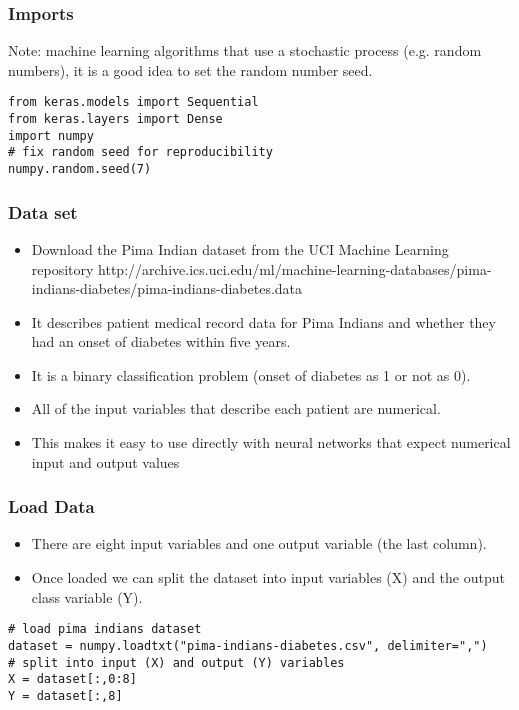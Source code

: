 \begin{frame}[fragile] \frametitle{Imports}
Note: machine learning algorithms that use a stochastic process (e.g. random numbers), it is a good idea to set the random number seed.
\begin{lstlisting}
from keras.models import Sequential
from keras.layers import Dense
import numpy
# fix random seed for reproducibility
numpy.random.seed(7)
\end{lstlisting}
\end{frame}

\begin{frame}[fragile] \frametitle{Data set}
 \begin{itemize}
 \item  Download the Pima Indian dataset from the UCI Machine Learning repository http://archive.ics.uci.edu/ml/machine-learning-databases/pima-indians-diabetes/pima-indians-diabetes.data 
\item  It describes patient medical record data for Pima Indians and whether they had an onset of diabetes within five years.
\item  It is a binary classification problem (onset of diabetes as 1 or not as 0). 
\item All of the input variables that describe each patient are numerical. 
\item This makes it easy to use directly with neural networks that expect numerical input and output values
\end{itemize}
\end{frame}

\begin{frame}[fragile] \frametitle{Load Data}
 \begin{itemize}
\item  There are eight input variables and one output variable (the last column).
\item Once loaded we can split the dataset into input variables (X) and the output class variable (Y).
\end{itemize}
\begin{lstlisting}
# load pima indians dataset
dataset = numpy.loadtxt("pima-indians-diabetes.csv", delimiter=",")
# split into input (X) and output (Y) variables
X = dataset[:,0:8]
Y = dataset[:,8]
\end{lstlisting}
\end{frame}

